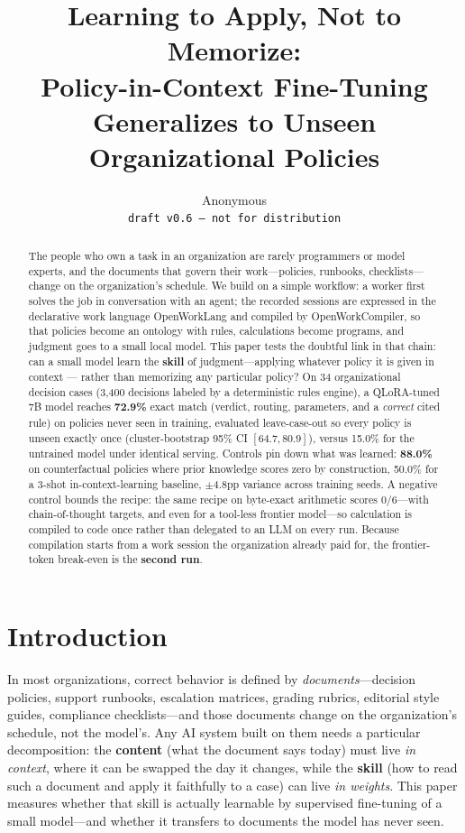 \documentclass[11pt]{article}
\title{Learning to Apply, Not to Memorize: \\ Policy-in-Context Fine-Tuning Generalizes to Unseen Organizational Policies}
\author{Anonymous \\ \texttt{draft v0.6 --- not for distribution}}
\begin{document}
\maketitle

\begin{abstract}
The people who own a task in an organization are rarely programmers or model experts, and the documents that govern their work---policies, runbooks, checklists---change on the organization's schedule. We build on a simple workflow: a worker first solves the job in conversation with an agent; the recorded sessions are expressed in the declarative work language OpenWorkLang and compiled by OpenWorkCompiler, so that policies become an ontology with rules, calculations become programs, and judgment goes to a small local model. This paper tests the doubtful link in that chain: can a small model learn the \textbf{skill} of judgment---applying whatever policy it is given in context — rather than memorizing any particular policy? On 34 organizational decision cases (3,400 decisions labeled by a deterministic rules engine), a QLoRA-tuned 7B model reaches \textbf{72.9\%} exact match (verdict, routing, parameters, and a \emph{correct} cited rule) on policies never seen in training, evaluated leave-case-out so every policy is unseen exactly once (cluster-bootstrap 95\% CI $[64.7, 80.9]$), versus 15.0\% for the untrained model under identical serving. Controls pin down what was learned: \textbf{88.0\%} on counterfactual policies where prior knowledge scores zero by construction, 50.0\% for a 3-shot in-context-learning baseline, $\pm$4.8pp variance across training seeds. A negative control bounds the recipe: the same recipe on byte-exact arithmetic scores 0/6---with chain-of-thought targets, and even for a tool-less frontier model---so calculation is compiled to code once rather than delegated to an LLM on every run. Because compilation starts from a work session the organization already paid for, the frontier-token break-even is the \textbf{second run}.
\end{abstract}

\section{Introduction}

In most organizations, correct behavior is defined by \emph{documents}---decision policies, support runbooks, escalation matrices, grading rubrics, editorial style guides, compliance checklists---and those documents change on the organization's schedule, not the model's. Any AI system built on them needs a particular decomposition: the \textbf{content} (what the document says today) must live \emph{in context}, where it can be swapped the day it changes, while the \textbf{skill} (how to read such a document and apply it faithfully to a case) can live \emph{in weights}. This paper measures whether that skill is actually learnable by supervised fine-tuning of a small model---and whether it transfers to documents the model has never seen.
\end{document}
